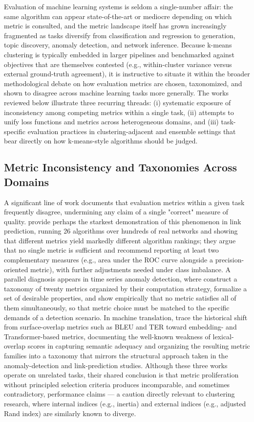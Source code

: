 Evaluation of machine learning systems is seldom a single-number affair: the same algorithm can appear state-of-the-art or mediocre depending on which metric is consulted, and the metric landscape itself has grown increasingly fragmented as tasks diversify from classification and regression to generation, topic discovery, anomaly detection, and network inference. Because k-means clustering is typically embedded in larger pipelines and benchmarked against objectives that are themselves contested (e.g., within-cluster variance versus external ground-truth agreement), it is instructive to situate it within the broader methodological debate on how evaluation metrics are chosen, taxonomized, and shown to disagree across machine learning tasks more generally. The works reviewed below illustrate three recurring threads: (i) systematic exposure of inconsistency among competing metrics within a single task, (ii) attempts to unify loss functions and metrics across heterogeneous domains, and (iii) task-specific evaluation practices in clustering-adjacent and ensemble settings that bear directly on how k-means-style algorithms should be judged.

\subsection{Metric Inconsistency and Taxonomies Across Domains}
A significant line of work documents that evaluation metrics within a given task frequently disagree, undermining any claim of a single "correct" measure of quality. \cite{bi2024inconsistency} provide perhaps the starkest demonstration of this phenomenon in link prediction, running 26 algorithms over hundreds of real networks and showing that different metrics yield markedly different algorithm rankings; they argue that no single metric is sufficient and recommend reporting at least two complementary measures (e.g., area under the ROC curve alongside a precision-oriented metric), with further adjustments needed under class imbalance. A parallel diagnosis appears in time series anomaly detection, where \cite{srb2023navigating} construct a taxonomy of twenty metrics organized by their computation strategy, formalize a set of desirable properties, and show empirically that no metric satisfies all of them simultaneously, so that metric choice must be matched to the specific demands of a detection scenario. In machine translation, \cite{lee2023survey} trace the historical shift from surface-overlap metrics such as BLEU and TER toward embedding- and Transformer-based metrics, documenting the well-known weakness of lexical-overlap scores in capturing semantic adequacy and organizing the resulting metric families into a taxonomy that mirrors the structural approach taken in the anomaly-detection and link-prediction studies. Although these three works operate on unrelated tasks, their shared conclusion is that metric proliferation without principled selection criteria produces incomparable, and sometimes contradictory, performance claims --- a caution directly relevant to clustering research, where internal indices (e.g., inertia) and external indices (e.g., adjusted Rand index) are similarly known to diverge.

